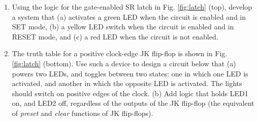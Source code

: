 \documentclass[10pt]{article}
\begin{document}
\begin{enumerate}
\item Using the logic for the gate-enabled SR latch in Fig. \ref{fig:latch} (top), develop a system that (a) activates a green LED when the circuit is enabled and in SET mode, (b) a yellow LED switch when the circuit is enabled and in RESET mode, and (c) a red LED when the circuit is not enabled. \\ \vspace{2cm}
\item The truth table for a positive clock-edge JK flip-flop is shown in Fig. \ref{fig:latch} (bottom).  Use such a device to design a circuit below that (a) powers two LEDs, and toggles between two states: one in which one LED is activated, and another in which the opposite LED is activated. The lights should switch on positive edges of the clock.  (b) Add logic that holds LED1 on, and LED2 off, regardless of the outputs of the JK flip-flop (the equivalent of \textit{preset} and \textit{clear} functions of JK flip-flops).
\end{enumerate}
\end{document}
